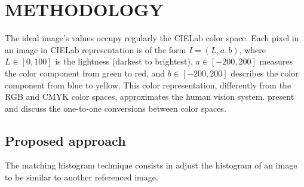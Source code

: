 \documentclass{article}
\begin{document}
\section{METHODOLOGY}
\label{sec:meth}


The ideal image's values occupy regularly the CIELab color space.
Each pixel in an image in CIELab representation is of the form $I= (L, a, b)$, where 
$L\in[0,100]$ is the lightness (darkest to brightest), 
$a\in[-200,200]$ measures the color component from green to red, and 
$b\in[-200,200]$ describes the color component from blue to yellow.
This color representation, differently from the RGB and CMYK color spaces, approximates the human vision system.
\citet{AssessingInformationContentinColorImages} present and discuss the one-to-one conversions between color spaces.


%

\subsection{Proposed approach}
\label{match}
The matching histogram technique consists in adjust the histogram of an image to be similar to another referenced image.
\end{document}
